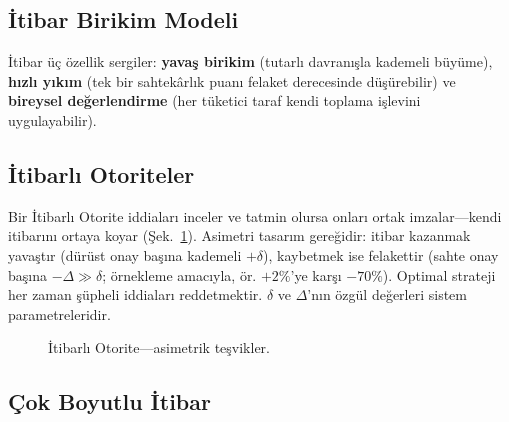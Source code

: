 \documentclass[11pt,a4paper,twocolumn]{article}
\begin{document}
\subsection{İtibar Birikim Modeli}

İtibar üç özellik sergiler: \textbf{yavaş birikim} (tutarlı davranışla kademeli büyüme), \textbf{hızlı yıkım} (tek bir sahtekârlık puanı felaket derecesinde düşürebilir) ve \textbf{bireysel değerlendirme} (her tüketici taraf kendi toplama işlevini uygulayabilir).

\subsection{İtibarlı Otoriteler}

Bir İtibarlı Otorite iddiaları inceler ve tatmin olursa onları ortak imzalar---kendi itibarını ortaya koyar (Şek.~\ref{fig:authority}). Asimetri tasarım gereğidir: itibar kazanmak yavaştır (dürüst onay başına kademeli $+\delta$), kaybetmek ise felakettir (sahte onay başına $-\Delta \gg \delta$; örnekleme amacıyla, ör. $+2\%$'ye karşı $-70\%$). Optimal strateji her zaman şüpheli iddiaları reddetmektir. $\delta$ ve $\Delta$'nın özgül değerleri sistem parametreleridir.

\begin{figure}[ht]
\centering
{}
\caption{İtibarlı Otorite---asimetrik teşvikler.}
\label{fig:authority}
\end{figure}

\subsection{Çok Boyutlu İtibar}
\end{document}
